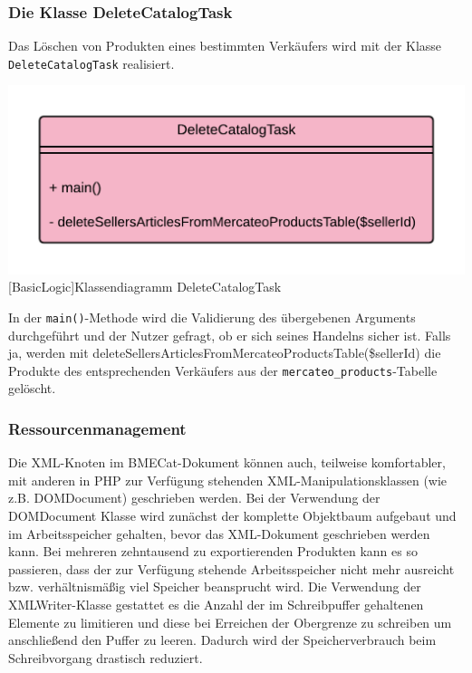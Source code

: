 	\subsubsection{Die Klasse DeleteCatalogTask}
	
	Das Löschen von Produkten eines bestimmten Verkäufers wird mit der Klasse \texttt{DeleteCatalogTask} realisiert. 
	
	\begin{minipage}{\linewidth}
		\vspace{1em}
		\centering
		\includegraphics[width=0.4 \linewidth]{img/DeleteCatalogTask}
		[BasicLogic]{Klassendiagramm DeleteCatalogTask}
		\vspace{1em}
	\end{minipage}	
	
	In der \texttt{main()}-Methode wird die Validierung des übergebenen Arguments durchgeführt und der Nutzer gefragt, ob er sich seines Handelns sicher ist. Falls ja, werden mit deleteSellersArticlesFromMercateoProductsTable(\$sellerId) die Produkte des entsprechenden Verkäufers aus der \texttt{mercateo\_products}-Tabelle gelöscht.

	\subsubsection{Ressourcenmanagement}
	
	Die XML-Knoten im BMECat-Dokument können auch, teilweise komfortabler, mit anderen in PHP zur Verfügung stehenden XML-Manipulationsklassen (wie z.B.  DOMDocument) geschrieben werden. Bei der Verwendung der DOMDocument Klasse wird zunächst der komplette Objektbaum aufgebaut und im Arbeitsspeicher gehalten, bevor das XML-Dokument geschrieben werden kann. Bei mehreren zehntausend zu exportierenden Produkten kann es so passieren, dass der zur Verfügung stehende Arbeitsspeicher nicht mehr ausreicht bzw. verhältnismäßig viel Speicher beansprucht wird. Die Verwendung der XMLWriter-Klasse gestattet es die Anzahl der im Schreibpuffer gehaltenen Elemente zu limitieren und diese bei Erreichen der Obergrenze zu schreiben um anschließend den Puffer zu leeren. Dadurch wird der Speicherverbrauch beim Schreibvorgang drastisch reduziert. 
		
